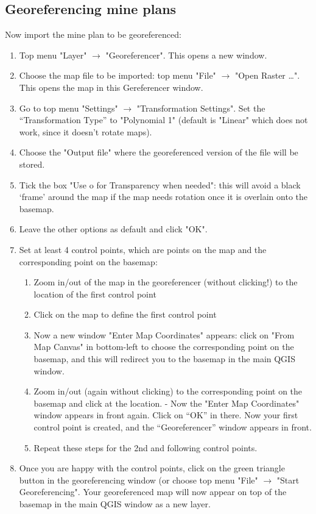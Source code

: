 \subsection{Georeferencing mine plans}
Now import the mine plan to be georeferenced:
\begin{enumerate}
    \item Top menu "Layer" $\rightarrow$ "Georeferencer". This opens a new window. 
    \item Choose the map file to be imported: top menu "File" $\rightarrow$ "Open Raster …". This opens the map in this Gereferencer window.
    \item Go to top menu "Settings" $\rightarrow$ "Transformation Settings". Set the “Transformation Type” to "Polynomial 1" (default is "Linear" which does not work, since it doesn’t rotate maps).
    \item Choose  the "Output file" where the georeferenced version of the file will be stored. 
    \item Tick the box "Use o for Transparency when needed": this will avoid a black ‘frame’ around the map if the map needs rotation once it is overlain onto the basemap. 
    \item Leave the other options as default and click "OK".
    \item Set at least 4 control points, which are points on the map and the corresponding point on the basemap:
    \begin{enumerate}
        \item Zoom in/out of the map in the georeferencer (without clicking!) to the location of the first control point
        \item Click on the map to define the first control point
        \item Now a new window "Enter Map Coordinates" appears: click on "From Map Canvas" in bottom-left to choose the corresponding point on the basemap, and this will redirect you to the basemap in the main QGIS window.
        \item Zoom in/out (again without clicking) to the corresponding point on the basemap and click at the location.
        - Now the "Enter Map Coordinates" window appears in front again. Click on “OK” in there. Now your first control point is created, and the “Georeferencer” window appears in front. 
        \item Repeat these steps for the 2nd and following control points. 
    \end{enumerate}
    \item Once you are happy with the control points, click on the green triangle button in the georeferencing window (or choose top menu "File" $\rightarrow$ "Start Georeferencing". Your georeferenced map will now appear on top of the basemap in the main QGIS window as a new layer. 

\end{enumerate}
